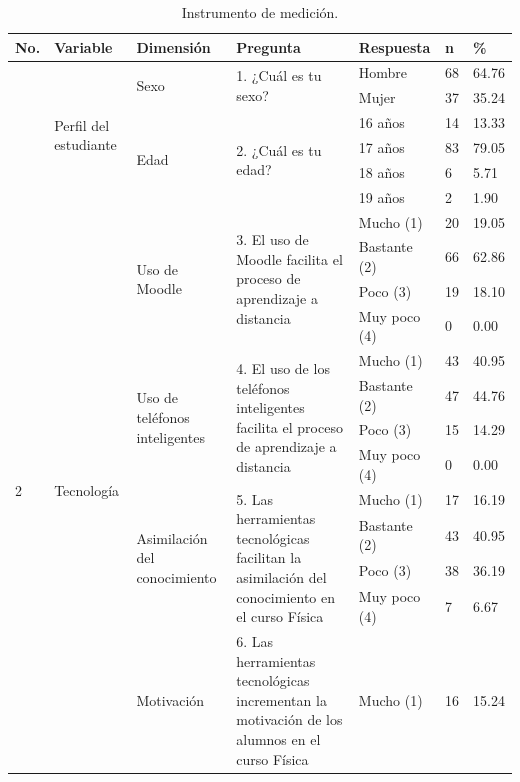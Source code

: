 \documentclass[spanish]{textolivre}
\begin{document}
\begin{table}[htpb]
\small
\begin{threeparttable}
\caption{Instrumento de medición.}
\label{tab01}
\begin{tabular}{*{3}{l}p{3.5cm}*{3}{l}}
\toprule
No. & Variable & Dimensión & Pregunta & Respuesta & n & \% \\
\midrule
\arrayrulecolor[gray]{.7}
\multirow{6}{*}{1} & \multicolumn{1}{p{1.5cm}}{\multirow{6}{=}{Perfil del estudiante}} & \multirow{2}{*}{Sexo} & \multirow{2}{=}{1. ¿Cuál es tu sexo?} & Hombre & 68 & 64.76 \\
 & & & & Mujer & 37 & 35.24 \\
 \cmidrule{3-7}
 & & \multirow{4}{*}{Edad} & \multirow{4}{*}{2. ¿Cuál es tu edad?} & 16 años & 14 & 13.33 \\
 & & & & 17 años & 83 & 79.05 \\
 & & & & 18 años & 6 & 5.71 \\
 & & & & 19 años & 2 & 1.90 \\
\midrule
\multirow{20}{*}{2} & \multicolumn{1}{p{1.5cm}}{\multirow{20}{*}{Tecnología}} & \multirow{4}{*}{Uso de Moodle} & \multirow{4}{=}{3. El uso de Moodle facilita el proceso de aprendizaje a distancia} & Mucho (1) & 20 & 19.05 \\ 
 & & & & Bastante (2) & 66 & 62.86 \\
 & & & & Poco (3) & 19 & 18.10 \\
 & & & & Muy poco (4) & 0 & 0.00 \\
 \cmidrule{3-7}
 & & \multicolumn{1}{p{3cm}}{\multirow{4}{=}{Uso de teléfonos inteligentes}} & \multirow{4}{=}{4. El uso de los teléfonos inteligentes facilita el proceso de aprendizaje a distancia} & Mucho (1) & 43 & 40.95 \\
 & & & & Bastante (2) & 47 & 44.76 \\
 & & & & Poco (3) & 15 & 14.29 \\
 & & & & Muy poco (4) & 0 & 0.00 \\
 \cmidrule{3-7}
 & & \multicolumn{1}{p{3cm}}{\multirow{4}{=}{Asimilación del conocimiento}} & \multirow{4}{=}{5. Las herramientas tecnológicas facilitan la asimilación del conocimiento en el curso Física} & Mucho (1) & 17 & 16.19 \\
 & & & & Bastante (2) & 43 & 40.95 \\
 & & & & Poco (3) & 38 & 36.19 \\
 & & & & Muy poco (4) & 7 & 6.67 \\
 \cmidrule{3-7}
 & & \multicolumn{1}{p{3cm}}{\multirow{4}{=}{Motivación}} & \multirow{4}{=}{6. Las herramientas tecnológicas incrementan la motivación de los alumnos en el curso Física} & Mucho (1) & 16 & 15.24 \\

\end{tabular}
\end{threeparttable}
\end{table}
\end{document}
